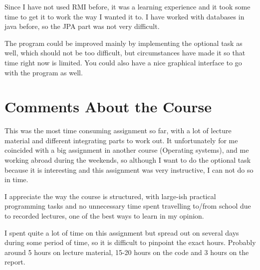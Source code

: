 \documentclass[a4paper]{scrartcl}
\begin{document}
Since I have not used RMI before, it was a learning experience and it took some time to get it to work the way I wanted it to. I have worked with databases in java before, so the JPA part was not very difficult.

The program could be improved mainly by implementing the optional task as well, which should not be too difficult, but circumstances have made it so that time right now is limited. You could also have a nice graphical interface to go with the program as well.


\section{Comments About the Course}

This was the most time consuming assignment so far, with a lot of lecture material and different integrating parts to work out. It unfortunately for me coincided with a big assignment in another course (Operating systems), and me working abroad during the weekends, so although I want to do the optional task because it is interesting and this assignment was very instructive, I can not do so in time.

I appreciate the way the course is structured, with large-ish practical programming tasks and no unnecessary time spent travelling to/from school due to recorded lectures, one of the best ways to learn in my opinion.

I spent quite a lot of time on this assignment but spread out on several days during some period of time, so it is difficult to pinpoint the exact hours. Probably around 5 hours on lecture material, 15-20 hours on the code and 3 hours on the report.
\end{document}
